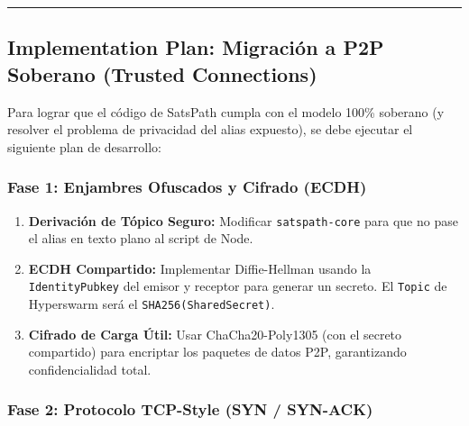 \documentclass[
]{article}
\providecommand{\tightlist}{%
  \setlength{\itemsep}{0pt}\setlength{\parskip}{0pt}}
\begin{document}
\begin{center}\rule{0.5\linewidth}{0.5pt}\end{center}

\hypertarget{implementation-plan-migraciuxf3n-a-p2p-soberano-trusted-connections}{%
\subsection{Implementation Plan: Migración a P2P Soberano (Trusted
Connections)}\label{implementation-plan-migraciuxf3n-a-p2p-soberano-trusted-connections}}

Para lograr que el código de SatsPath cumpla con el modelo 100\%
soberano (y resolver el problema de privacidad del alias expuesto), se
debe ejecutar el siguiente plan de desarrollo:

\hypertarget{fase-1-enjambres-ofuscados-y-cifrado-ecdh}{%
\subsubsection{Fase 1: Enjambres Ofuscados y Cifrado
(ECDH)}\label{fase-1-enjambres-ofuscados-y-cifrado-ecdh}}

\begin{enumerate}
\def\labelenumi{\arabic{enumi}.}
\tightlist
\item[$\square$]
  \textbf{Derivación de Tópico Seguro:} Modificar \texttt{satspath-core}
  para que no pase el alias en texto plano al script de Node.
\item[$\square$]
  \textbf{ECDH Compartido:} Implementar Diffie-Hellman usando la
  \texttt{IdentityPubkey} del emisor y receptor para generar un secreto.
  El \texttt{Topic} de Hyperswarm será el \texttt{SHA256(SharedSecret)}.
\item[$\square$]
  \textbf{Cifrado de Carga Útil:} Usar ChaCha20-Poly1305 (con el secreto
  compartido) para encriptar los paquetes de datos P2P, garantizando
  confidencialidad total.
\end{enumerate}

\hypertarget{fase-2-protocolo-tcp-style-syn-syn-ack}{%
\subsubsection{Fase 2: Protocolo TCP-Style (SYN /
SYN-ACK)}\label{fase-2-protocolo-tcp-style-syn-syn-ack}}
\end{document}
